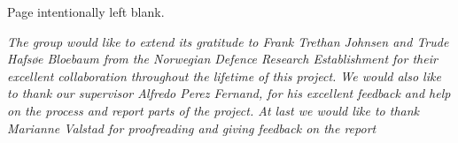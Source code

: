 \vspace*{\fill}
\begin{center}
Page intentionally left blank.
\end{center}
\vspace*{\fill}

\pagebreak

\vspace*{7cm}
\begin{center}

\emph{The group would like to extend its gratitude to Frank Trethan Johnsen and Trude Hafsøe Bloebaum from the Norwegian Defence Research Establishment for their excellent collaboration throughout the lifetime of this project. We would also like to thank our supervisor Alfredo Perez Fernand, for his excellent feedback and help on the process and report parts of the project. At last we would like to thank Marianne Valstad for proofreading and giving feedback on the report}

\end{center}